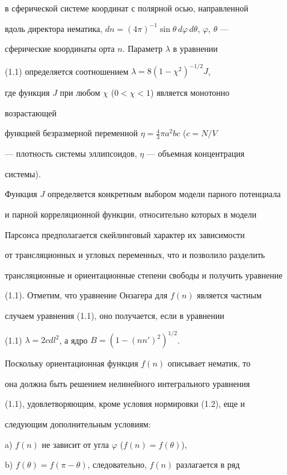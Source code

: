 в сферической системе координат с полярной осью, направленной 


вдоль директора нематика, $dn=(4\pi)^{-


1}\sin\theta\,d\varphi\,d\theta$, $\varphi$, $\theta$ --- 


сферические координаты орта $n$. Параметр $\lambda$ в уравнении 


(1.1) определяется соотношением $\lambda=8(1-\chi^2)^{-1/2}J$, 


где функция $J$ при любом $\chi$ ($0<\chi<1$) является монотонно 


возрастающей 


функцией безразмерной переменной $\eta=\frac{4}{3}\pi a^2bc$ ($c=N/V$ 


--- плотность системы эллипсоидов, $\eta$ --- объемная концентрация 


системы).  


Функция $J$ определяется конкретным выбором модели парного потенциала 


и парной корреляционной функции, относительно которых в модели 


Парсонса предполагается скейлинговый характер их зависимости  


от трансляционных и угловых переменных, что и позволило разделить  


трансляционные и ориентационные степени свободы и получить уравнение 


(1.1). Отметим, что уравнение Онзагера для $f(n)$ является частным 


случаем уравнения (1.1), оно получается, если в уравнении 


(1.1)\; $\lambda=2cdl^2$, а ядро $B=(1-(nn')^2)^{1/2}$. 


 


Поскольку ориентационная функция $f(n)$ описывает нематик, то  


она должна быть решением нелинейного интегрального уравнения  


(1.1), удовлетворяющим, кроме условия нормировки (1.2), еще и  


следующим дополнительным условиям:


 


a) $f(n)$ не зависит от угла $\varphi$ ($f(n)=f(\theta)$), 


 


b) $f(\theta)=f(\pi-\theta)$, следовательно, $f(n)$ разлагается в ряд 


